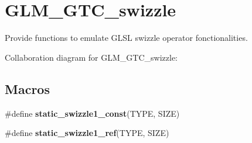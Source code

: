 \hypertarget{group__gtc__swizzle}{}\section{G\+L\+M\+\_\+\+G\+T\+C\+\_\+swizzle}
\label{group__gtc__swizzle}


Provide functions to emulate G\+L\+S\+L swizzle operator fonctionalities.  


Collaboration diagram for G\+L\+M\+\_\+\+G\+T\+C\+\_\+swizzle\+:
\subsection*{Macros}
\begin{DoxyCompactItemize}
\item 
\#define {\bfseries static\+\_\+swizzle1\+\_\+const}(T\+Y\+P\+E,  S\+I\+Z\+E)
\item 
\#define {\bfseries static\+\_\+swizzle1\+\_\+ref}(T\+Y\+P\+E,  S\+I\+Z\+E)
\end{DoxyCompactItemize}
